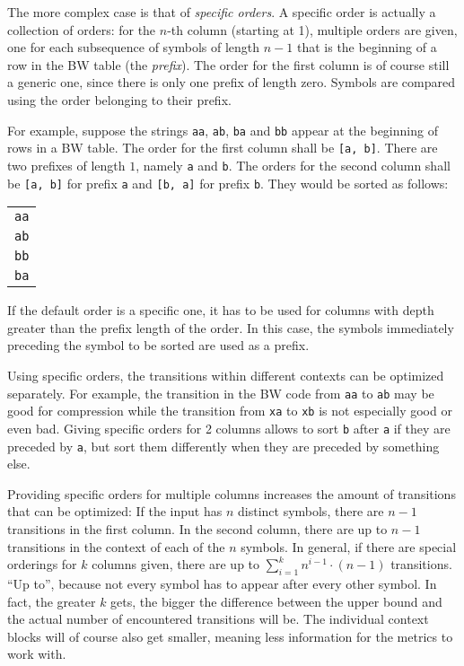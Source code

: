 \documentclass[a4paper]{scrreprt}
\begin{document}
The more complex case is that of \emph{specific orders}. A specific order is
actually a collection of orders: for the \(n\)-th column (starting at 1),
multiple orders are given, one for each subsequence of symbols of length \(n -
1\) that is the beginning of a row in the BW table (the \emph{prefix}). The
order for the first column is of course still a generic one, since there is only
one prefix of length zero. Symbols are compared using the order belonging to
their prefix.

For example, suppose the strings \texttt{aa}, \texttt{ab}, \texttt{ba} and
\texttt{bb} appear at the beginning of rows in a BW table. The order for the
first column shall be \texttt{[a, b]}. There are two prefixes of length \(1\),
namely \texttt{a} and \texttt{b}. The orders for the second column shall be
\texttt{[a, b]} for prefix \texttt{a} and \texttt{[b, a]} for prefix \texttt{b}.
They would be sorted as follows:

\begin{tabular}{c}
\texttt{aa} \\
\texttt{ab} \\
\texttt{bb} \\ 
\texttt{ba} \\
\end{tabular}

If the default order is a specific one, it has to be used for columns with depth
greater than the prefix length of the order. In this case, the symbols
immediately preceding the symbol to be sorted are used as a prefix.

Using specific orders, the transitions within different contexts can be
optimized separately. For example, the transition in the BW code from
\texttt{aa} to \texttt{ab} may be good for compression while the transition
from \texttt{xa} to \texttt{xb} is not especially good or even bad. Giving
specific orders for 2 columns allows to sort \texttt{b} after \texttt{a} if
they are preceded by \texttt{a}, but sort them differently when they are
preceded by something else.

Providing specific orders for multiple columns increases the amount of
transitions that can be optimized: If the input has \(n\) distinct symbols,
there are \(n - 1\) transitions in the first column. In the second column, there
are up to \(n - 1\) transitions in the context of each of the \(n\) symbols. In
general, if there are special orderings for \(k\) columns given, there are up to
\(\sum_{i=1}^{k} n^{i - 1} \cdot (n - 1)\) transitions. ``Up to'', because not
every symbol has to appear after every other symbol. In fact, the greater \(k\)
gets, the bigger the difference between the upper bound and the actual number of
encountered transitions will be. The individual context blocks will of course
also get smaller, meaning less information for the metrics to work with.
\end{document}
